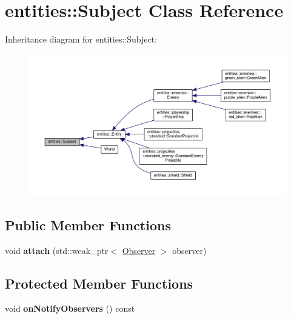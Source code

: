 \hypertarget{classentities_1_1Subject}{}\section{entities\+:\+:Subject Class Reference}
\label{classentities_1_1Subject}


Inheritance diagram for entities\+:\+:Subject\+:\nopagebreak
\begin{figure}[H]
\begin{center}
\leavevmode
\includegraphics[width=350pt]{classentities_1_1Subject__inherit__graph}
\end{center}
\end{figure}
\subsection*{Public Member Functions}
\begin{DoxyCompactItemize}
\item 
\mbox{\label{classentities_1_1Subject_a17c678c4c3c50a76fd972952a7e7ca75}} 
void {\bfseries attach} (std\+::weak\+\_\+ptr$<$ \hyperlink{classentities_1_1Observer}{Observer} $>$ observer)
\end{DoxyCompactItemize}
\subsection*{Protected Member Functions}
\begin{DoxyCompactItemize}
\item 
\mbox{\label{classentities_1_1Subject_a2562dcbae6bbb26ce21cec268fe5ed41}} 
void {\bfseries on\+Notify\+Observers} () const
\end{DoxyCompactItemize}
